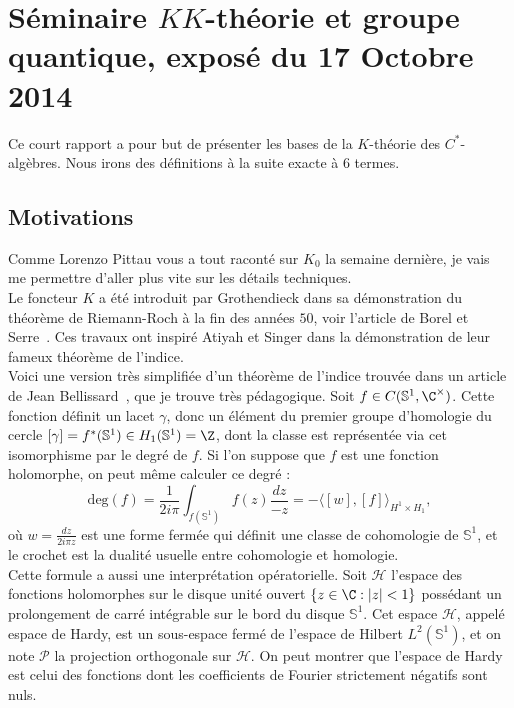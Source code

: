 \section{Séminaire $KK$-théorie et groupe quantique, exposé du 17 Octobre 2014}

Ce court rapport a pour but de présenter les bases de la $K$-théorie des $C^*$-algèbres. Nous irons des définitions à la suite exacte à $6$ termes. 

\subsection{Motivations}

Comme Lorenzo Pittau vous a tout raconté sur $K_0$ la semaine dernière, je vais me permettre d'aller plus vite sur les détails techniques. \\

Le foncteur $K$ a été introduit par Grothendieck dans sa démonstration du théorème de Riemann-Roch à la fin des années $50$, voir l'article de Borel et Serre~\cite{BorelSerre}. Ces travaux ont inspiré Atiyah et Singer dans la démonstration de leur fameux théorème de l'indice. \\

Voici une version très simplifiée d'un théorème de l'indice trouvée dans un article de Jean Bellissard~\cite{Bellissard}, que je trouve très pédagogique. Soit $f\in C(\mathbb S^1,\C^\times)$. Cette fonction définit un lacet $\gamma$, donc un élément du premier groupe d'homologie du cercle $[\gamma]=f^*(\mathbb S^1)\in H_1(\mathbb S^1)=\Z$, dont la classe est représentée via cet isomorphisme par le degré de $f$. Si l'on suppose que $f$ est une fonction holomorphe, on peut même calculer ce degré : 
\[\text{deg}(f)=\frac{1}{2i\pi}\int_{f(\mathbb S^1)} f(z)\frac{dz}{-z}= -\langle [w],[f]\rangle_{H^1\times H_1},\] 
où $w=\frac{dz}{2i\pi z}$ est une forme fermée qui définit une classe de cohomologie de $\mathbb S^1$, et le crochet est la dualité usuelle entre cohomologie et homologie.\\

Cette formule a aussi une interprétation opératorielle. Soit $\mathcal H$ l'espace des fonctions holomorphes sur le disque unité ouvert $\{z\in \C : |z|<1\}$ possédant un prolongement de carré intégrable sur le bord du disque $\mathbb S^1$. Cet espace $\mathcal H$, appelé espace de Hardy, est un sous-espace fermé de l'espace de Hilbert $L^2(\mathbb S^1)$, et on note $\mathcal P$ la projection orthogonale sur $\mathcal H$. On peut montrer que l'espace de Hardy est celui des fonctions dont les coefficients de Fourier strictement négatifs sont nuls.\\

